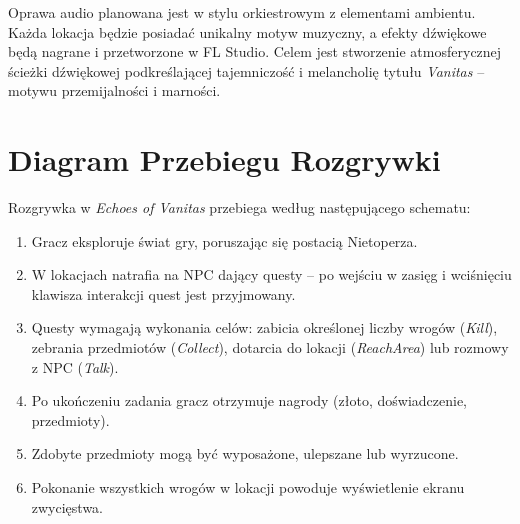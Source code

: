 Oprawa audio planowana jest w stylu orkiestrowym z elementami ambientu. Każda lokacja będzie posiadać unikalny motyw muzyczny, a efekty dźwiękowe będą nagrane i przetworzone w FL Studio. Celem jest stworzenie atmosferycznej ścieżki dźwiękowej podkreślającej tajemniczość i melancholię tytułu \textit{Vanitas} – motywu przemijalności i marności.

\section{Diagram Przebiegu Rozgrywki}

Rozgrywka w \textit{Echoes of Vanitas} przebiega według następującego schematu:

\begin{enumerate}
    \item Gracz eksploruje świat gry, poruszając się postacią Nietoperza.
    \item W lokacjach natrafia na NPC dający questy – po wejściu w zasięg i wciśnięciu klawisza interakcji quest jest przyjmowany.
    \item Questy wymagają wykonania celów: zabicia określonej liczby wrogów (\textit{Kill}), zebrania przedmiotów (\textit{Collect}), dotarcia do lokacji (\textit{ReachArea}) lub rozmowy z NPC (\textit{Talk}).
    \item Po ukończeniu zadania gracz otrzymuje nagrody (złoto, doświadczenie, przedmioty).
    \item Zdobyte przedmioty mogą być wyposażone, ulepszane lub wyrzucone.
    \item Pokonanie wszystkich wrogów w lokacji powoduje wyświetlenie ekranu zwycięstwa.
\end{enumerate}
